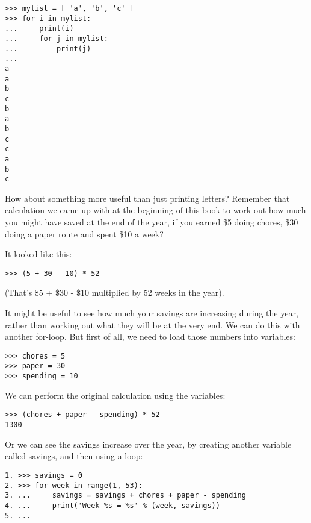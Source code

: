 \begin{listing}
\begin{verbatim}
>>> mylist = [ 'a', 'b', 'c' ]
>>> for i in mylist:
...     print(i)
...     for j in mylist:
...         print(j)
... 
a
a
b
c
b
a
b
c
c
a
b
c
\end{verbatim}
\end{listing}

How about something more useful than just printing letters?  Remember that calculation we came up with at the beginning of this book to work out how much you might have saved at the end of the year, if you earned \$5 doing chores, \$30 doing a paper route and spent \$10 a week?
\par
\noindent
It looked like this:

\begin{listing}
\begin{verbatim}
>>> (5 + 30 - 10) * 52
\end{verbatim}
\end{listing}

\noindent
(That's \$5 + \$30 - \$10 multiplied by 52 weeks in the year).

It might be useful to see how much your savings are increasing during the year, rather than working out what they will be at the very end.  We can do this with another for-loop.  But first of all, we need to load those numbers into variables:

\begin{listing}
\begin{verbatim}
>>> chores = 5
>>> paper = 30
>>> spending = 10
\end{verbatim}
\end{listing}

We can perform the original calculation using the variables:

\begin{listing}
\begin{verbatim}
>>> (chores + paper - spending) * 52
1300
\end{verbatim}
\end{listing}

Or we can see the savings increase over the year, by creating another variable called savings, and then using a loop:

\begin{listing}
\begin{verbatim}
1. >>> savings = 0
2. >>> for week in range(1, 53):
3. ...     savings = savings + chores + paper - spending
4. ...     print('Week %s = %s' % (week, savings))
5. ...
\end{verbatim}
\end{listing}

